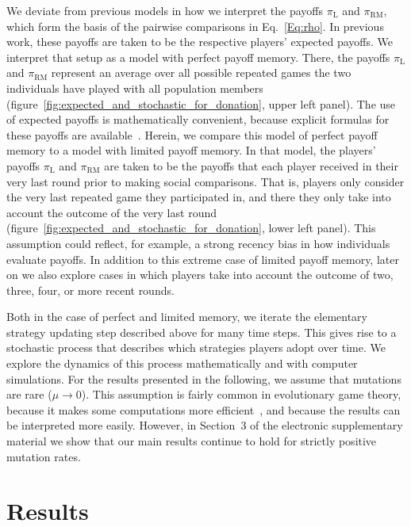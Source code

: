 \documentclass[11pt]{article}
\def\rolemodel{\text{RM}}
\def\learner{\text{L}}
\def\esm{electronic supplementary material}
\newcommand{\FigBaseResults}{figure~\ref{fig:expected_and_stochastic_for_donation}}
\theoremstyle{plainCl1}
\theoremstyle{plainCl2}
\begin{document}
We deviate from previous models in how we interpret the payoffs $\pi_\learner$ and $\pi_\rolemodel$, which form the basis of the pairwise comparisons in Eq.~\eqref{Eq:rho}. 
In previous work, these payoffs are taken to be the respective players' expected payoffs. 
We interpret that setup as a model with perfect payoff memory. 
There, the payoffs  $\pi_\learner$ and $\pi_\rolemodel$ represent an average over all possible repeated games the two individuals have played with all population members (\FigBaseResults, upper left panel). 
The use of expected payoffs is mathematically convenient, because explicit formulas for these payoffs are available~\citep{hofbauer1998evolutionary}.
Herein, we compare this model of perfect payoff memory to a model with limited payoff memory. 
In that model, the players' payoffs $\pi_\learner$ and $\pi_\rolemodel$ are taken to be the payoffs that each player received in their very last round prior to making social comparisons. 
That is, players only consider the very last repeated game they participated in, and there they only take into account the outcome of the very last round (\FigBaseResults, lower left panel). 
This assumption could reflect, for example, a strong recency bias in how individuals evaluate payoffs.  
In addition to this extreme case of limited payoff memory, later on we also explore cases in which players take into account the outcome of two, three, four, or more recent rounds. 


Both in the case of perfect and limited memory, we iterate the elementary strategy updating step described above for many time steps. 
This gives rise to a stochastic process that describes which strategies players adopt over time. 
We explore the dynamics of this process mathematically and with computer simulations.
For the results presented in the following, we assume that mutations are rare (\(\mu\!\rightarrow\! 0\)). 
This assumption is fairly common in evolutionary game theory, because it makes some computations more efficient~\citep{fudenberg:JET:2006,wu:JMB:2012,mcavoy:jet:2015}, and because the results can be interpreted more easily.  
However, in Section~3 of the \esm{} we show that our main results continue to hold for strictly positive mutation rates.




\section{Results}
\end{document}
